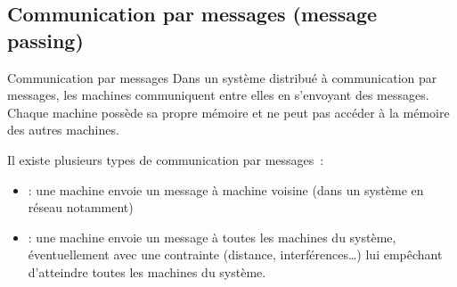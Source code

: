 \subsection{Communication par messages (message passing)}


\begin{definition}{}{Communication par messages}
  Dans un système distribué à communication par messages, les machines communiquent entre elles en s'envoyant des messages. Chaque machine possède sa propre mémoire et ne peut pas accéder à la mémoire des autres machines. \par 
Il existe plusieurs types de communication par messages~:
  \begin{itemize}
    \item {} : une machine envoie un message à machine voisine (dans un système en réseau notamment)
    \item {} : une machine envoie un message à toutes les machines du système, éventuellement avec une contrainte (distance, interférences\dots) lui empêchant d'atteindre toutes les machines du système.
  \end{itemize}
\end{definition}
